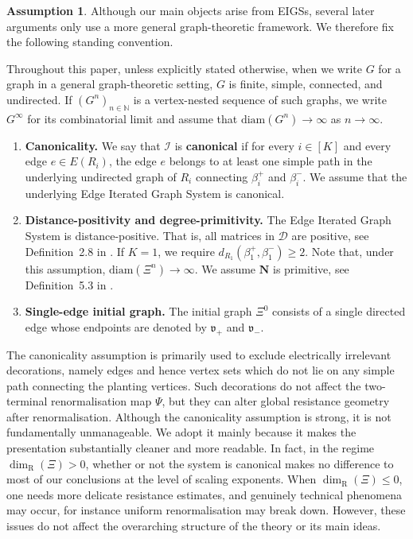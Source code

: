 \documentclass{article}
\theoremstyle{plain}
\theoremstyle{definition}
\newtheorem{assumption}[theorem]{Assumption}
\newcommand{\diam}{\mathrm{diam}}
\newcommand{\dimresis}{\dim_\mathrm{R}}
\begin{document}
\bigskip

\begin{assumption}\label{ass:standing}
Although our main objects arise from EIGSs, several later arguments only use a more general graph-theoretic framework.
We therefore fix the following standing convention.

Throughout this paper, unless explicitly stated otherwise, when we write $G$ for a graph in a general graph-theoretic setting, $G$ is finite, simple, connected, and undirected.
If $(G^n)_{n\in\mathbb N}$ is a vertex-nested sequence of such graphs, we write $G^\infty$ for its combinatorial limit and assume that $\diam(G^n)\to\infty$ as $n\to\infty$.

\begin{enumerate}
\item \textbf{Canonicality.}
We say that $\mathscr I$ is \textbf{canonical} if for every $i\in[K]$ and every edge $e\in E(R_i)$, the edge $e$ belongs to at least one simple path in the underlying undirected graph of $R_i$ connecting $\beta_i^+$ and $\beta_i^-$.
We assume that the underlying Edge Iterated Graph System is canonical.

\item \textbf{Distance-positivity and degree-primitivity.}
The Edge Iterated Graph System is distance-positive.
That is, all matrices in $\mathcal D$ are positive, see Definition~2.8 in \cite{neroli2024fractal}.
If $K=1$, we require $d_{R_1}(\beta_1^+,\beta_1^-) \geq 2$.
Note that, under this assumption, $\diam(\Xi^n)\to\infty$.
We assume $\mathbf N$ is primitive, see Definition~5.3 in \cite{li2024on}.

\item \textbf{Single-edge initial graph.}
The initial graph $\Xi^{0}$ consists of a single directed edge whose endpoints are denoted by $\mathfrak v_{+}$ and $\mathfrak v_{-}$.
\end{enumerate}
\end{assumption}

The canonicality assumption is primarily used to exclude electrically irrelevant decorations, namely edges and hence vertex sets which do not lie on any simple path connecting the planting vertices.
Such decorations do not affect the two-terminal renormalisation map $\Psi$, but they can alter global resistance geometry after renormalisation.
Although the canonicality assumption is strong, it is not fundamentally unmanageable.
We adopt it mainly because it makes the presentation substantially cleaner and more readable.
In fact, in the regime $\dimresis(\Xi)>0$, whether or not the system is canonical makes no difference to most of our conclusions at the level of scaling exponents.
When $\dimresis(\Xi)\le 0$, one needs more delicate resistance estimates, and genuinely technical phenomena may occur, for instance uniform renormalisation may break down.
However, these issues do not affect the overarching structure of the theory or its main ideas.
\end{document}
